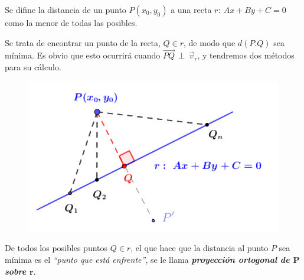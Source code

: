 \vspace{3mm}
\begin{definition}

\begin{multicols}{2}
Se difine la distancia de un punto $P(x_0,y_0)$ a una recta $r:\ Ax+By+C=0$ como	 la menor de todas las posibles. 

 Se trata de encontrar un punto de la recta, $Q\in r$, de modo que $d(P.Q)$ sea mínima. Es obvio que esto ocurrirá cuando $\overrightarrow{PQ} \, \perp \, \vec v_r$, y tendremos dos métodos para su cálculo.
\begin{figure}[H]
	\centering
	\includegraphics[width=.45\textwidth]{img-ga/ga21.png}
\end{figure} \end{multicols}

De todos los posibles puntos $Q\in r$, el que hace que la distancia al punto $P$ sea mínima es el \emph{``punto que está enfrente''}, se le llama \textbf{\emph{proyección ortogonal de $\boldsymbol P$ sobre $\boldsymbol r$}}.
\end{definition}

